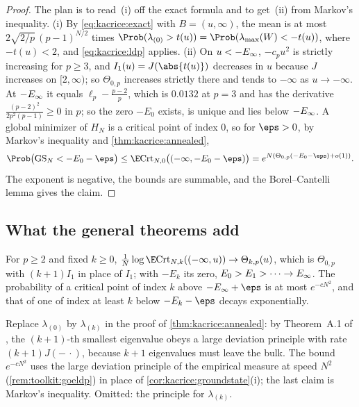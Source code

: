 \begin{refsection}
\begin{proof}
The plan is to read~(i) off the exact formula and to get~(ii) from Markov's inequality. (i) By \eqref{eq:kacrice:exact} with $B=(u,\infty)$, the mean is at most $2\sqrt{2/p}\,(p-1)^{N/2}$ times $\Prob(\lambda_{(0)}>t(u))=\Prob(\lambda_{\max}(W)<-t(u))$, where $-t(u)<2$, and \eqref{eq:kacrice:ldp} applies. (ii) On $u<-E_\infty$, $-c_pu^2$ is strictly increasing for $p\ge3$, and $I_1(u)=J(\abs{t(u)})$ decreases in $u$ because $J$ increases on $[2,\infty)$; so $\Theta_{0,p}$ increases strictly there and tends to $-\infty$ as $u\to-\infty$. At $-E_\infty$ it equals $\ell_p-\frac{p-2}p$, which is $0.0132$ at $p=3$ and has the derivative $\frac{(p-2)^2}{2p^2(p-1)}\ge0$ in $p$; so the zero $-E_0$ exists, is unique and lies below $-E_\infty$. A global minimizer of $H_N$ is a critical point of index $0$, so for $\eps>0$, by Markov's inequality and \cref{thm:kacrice:annealed},
\[
\Prob\bigl(\kacriceGS_N<-E_0-\eps\bigr)\le\E\kacriceCrt_{N,0}\bigl((-\infty,-E_0-\eps)\bigr)=e^{N(\Theta_{0,p}(-E_0-\eps)+o(1))}.
\]
The exponent is negative, the bounds are summable, and the Borel--Cantelli lemma gives the claim.
\end{proof}

\subsection{What the general theorems add}\label{sec:kacrice:general}

\begin{theorem}\label{thm:kacrice:index}
For $p\ge2$ and fixed $k\ge0$, $\frac1N\log\E\kacriceCrt_{N,k}((-\infty,u))\to\Theta_{k,p}(u)$, which is $\Theta_{0,p}$ with $(k+1)I_1$ in place of $I_1$; with $-E_k$ its zero, $E_0>E_1>\dots\to E_\infty$. The probability of a critical point of index $k$ above $-\kacriceinf+\eps$ is at most $e^{-cN^2}$, and that of one of index at least $k$ below $-E_k-\eps$ decays exponentially.
\end{theorem}

\begin{proofsketch}
Replace $\lambda_{(0)}$ by $\lambda_{(k)}$ in the proof of \cref{thm:kacrice:annealed}: by Theorem~A.1 of \textcite{AuffingerBenArousCerny2013}, the $(k+1)$-th smallest eigenvalue obeys a large deviation principle with rate $(k+1)J(-\,\cdot)$, because $k+1$ eigenvalues must leave the bulk. The bound $e^{-cN^2}$ uses the large deviation principle of the empirical measure at speed $N^2$ (\cref{rem:toolkit:goeldp}) in place of \cref{cor:kacrice:groundstate}(i); the last claim is Markov's inequality. Omitted: the principle for $\lambda_{(k)}$.
\end{proofsketch}


\end{refsection}

